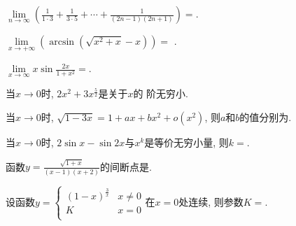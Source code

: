 \begin{problem}
	$\displaystyle \lim\limits_{n \rightarrow \infty}(\frac{1}{1 \cdot 3} + \frac{1}{3 \cdot 5} + \cdots + \frac{1}{(2n - 1)(2n + 1)}) =$.
				
\end{problem}          


 \begin{problem}$\lim\limits_{x \rightarrow + \infty}(\arcsin(\sqrt{x^{2} + x} - x)) =$
.
				
					
\end{problem}

\begin{problem}
$\displaystyle \lim\limits_{x \rightarrow \infty}x\sin\frac{2x}{1 + x^{2}} =$.
					
					
\end{problem}           

\begin{problem}
	当$x \rightarrow 0$时, $2x^{2} + 3x^{\frac{5}{2}}$是关于$x$的
	 阶无穷小.
		
\end{problem}           

\begin{problem}
	当$x \rightarrow 0$时, $\sqrt{1 - 3x} = 1 + ax + bx^{2} + o(x^{2})$, 则$a$和$b$的值分别为.
					
\end{problem}           

\begin{problem}
	当$x \rightarrow 0$时, $2\sin x - \sin 2x$与$x^{k}$是等价无穷小量, 则$k =$.
					
\end{problem}           
			
\begin{problem}
	函数$\displaystyle y = \frac{\sqrt{1 + x}}{(x - 1)(x + 2)}$的间断点是.
	
\end{problem}           

\begin{problem}
设函数$y =  \begin{cases}
					(1 - x)^{\frac{3}{x}} & x \neq 0 \\
					K & x = 0 \\
					\end{cases}  $在$x = 0$处连续, 则参数$K =$.
					
\end{problem}           

